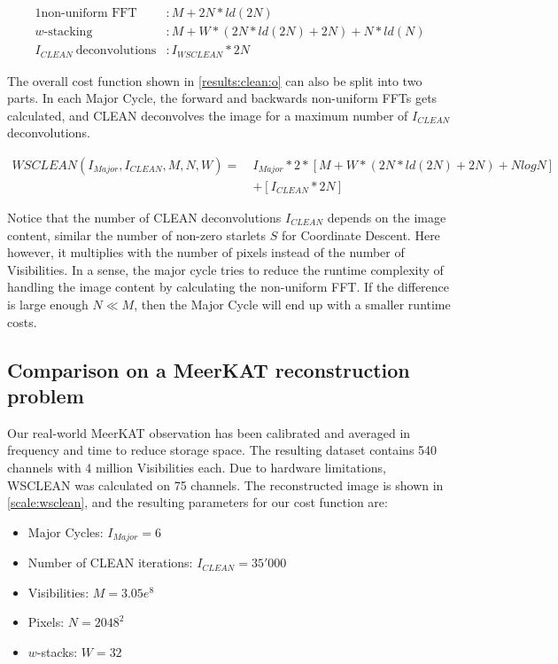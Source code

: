 \begin{alignat*}{1}
	\text{non-uniform FFT} &: M + 2N*ld(2N)\\
	w\text{-stacking} &:M + W*(2N*ld(2N) + 2N) + N*ld(N)\\
	I_{CLEAN}\: \text{deconvolutions} &: I_{WSCLEAN}*2N
\end{alignat*}

The overall cost function shown in \eqref{results:clean:o} can also be split into two parts. In each Major Cycle, the forward and backwards non-uniform FFTs gets calculated, and CLEAN deconvolves the image for a maximum number of $I_{CLEAN}$ deconvolutions.

\begin{equation}\label{results:clean:o}
\begin{aligned}
 WSCLEAN(I_{Major}, I_{CLEAN}, M, N,  W) =\: &I_{Major} * 2 * [M + W*(2N*ld(2N) + 2N) + N log N]\\
	&+ [I_{CLEAN}*2N]
\end{aligned}
\end{equation}

Notice that the number of CLEAN deconvolutions $I_{CLEAN}$ depends on the image content, similar the number of non-zero starlets $S$ for Coordinate Descent. Here however, it multiplies with the number of pixels instead of the number of Visibilities. In a sense, the major cycle tries to reduce the runtime complexity of handling the image content by calculating the non-uniform FFT. If the difference is large enough $N \ll M$, then the Major Cycle will end up with a smaller runtime costs.


\subsection{Comparison on a MeerKAT reconstruction problem}
Our real-world MeerKAT observation has been calibrated and averaged in frequency and time to reduce storage space. The resulting dataset contains 540 channels with 4 million Visibilities each. Due to hardware limitations, WSCLEAN was calculated on 75 channels. The reconstructed image is shown in \ref{scale:wsclean}, and the resulting parameters for our cost function are: 
\begin{itemize}
	\item Major Cycles: $I_{Major} = 6$
	\item Number of CLEAN iterations: $I_{CLEAN} = 35'000$
	\item Visibilities: $M=3.05e^8$
		\item Pixels: $N = 2048^2$
	\item $w$-stacks: $W = 32$
\end{itemize}

